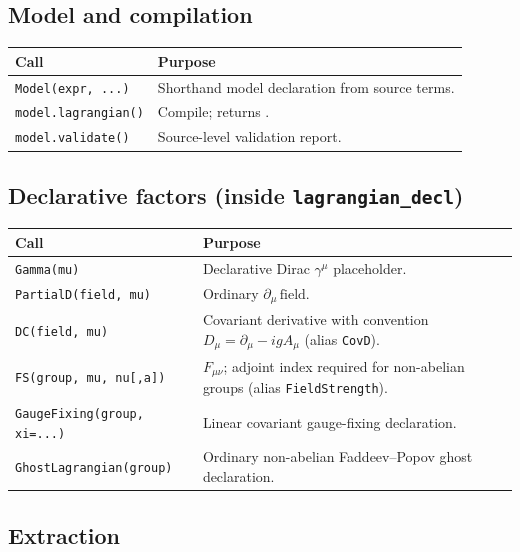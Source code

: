 \subsection*{Model and compilation}

\begin{center}
\begin{tabular}{@{}P{5.4cm}p{7cm}@{}}
\toprule
\normalfont\textbf{Call} & \textbf{Purpose} \\
\midrule
\texttt{Model(expr, ...)} & Shorthand model declaration from source terms. \\
\texttt{model.lagrangian()} & Compile; returns . \\
\texttt{model.validate()} & Source-level validation report. \\
\bottomrule
\end{tabular}
\end{center}

\subsection*{Declarative factors (inside \texttt{lagrangian\_decl})}

\begin{center}
\begin{tabular}{@{}P{5.4cm}p{7cm}@{}}
\toprule
\normalfont\textbf{Call} & \textbf{Purpose} \\
\midrule
\texttt{Gamma(mu)} & Declarative Dirac $\gamma^\mu$ placeholder. \\
\texttt{PartialD(field, mu)} & Ordinary $\partial_\mu\,\text{field}$. \\
\texttt{DC(field, mu)} & Covariant derivative with convention $D_\mu=\partial_\mu-igA_\mu$ (alias \texttt{CovD}). \\
\texttt{FS(group, mu, nu[,a])} & $F_{\mu\nu}$; adjoint index required for non-abelian groups (alias \texttt{FieldStrength}). \\
\texttt{GaugeFixing(group, xi=...)} & Linear covariant gauge-fixing declaration. \\
\texttt{GhostLagrangian(group)} & Ordinary non-abelian Faddeev--Popov ghost declaration. \\
\bottomrule
\end{tabular}
\end{center}

\subsection*{Extraction}


